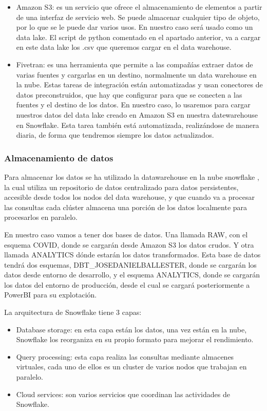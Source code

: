 \begin{itemize}
\begin{itemize}
    \end{itemize}
	\item Amazon S3: \cite{Amazon} es un servicio que ofrece el almacenamiento de elementos a partir de una interfaz de servicio web. Se puede almacenar cualquier tipo de objeto, por lo que se le puede dar varios usos. En nuestro caso será usado como un data lake. El script de python comentado en el apartado anterior, va a cargar en este data lake los .csv que queremos cargar en el data warehouse. 
	\item Fivetran: \cite{Fivetran} es una herramienta que permite a las compañías extraer datos de varias fuentes y cargarlas en un destino, normalmente un data warehouse en la nube. Estas tareas de integración están automatizadas y usan conectores de datos preconstruidos, que hay que configurar para que se conecten a las fuentes y el destino de los datos. En nuestro caso, lo usaremos para cargar nuestros datos del data lake creado en Amazon S3 en nuestra datewarehouse en Snowflake. Esta tarea también está automatizada, realizándose de manera diaria, de forma que tendremos siempre los datos actualizados. 

\end{itemize}

\subsubsection{Almacenamiento de datos}

Para almacenar los datos se ha utilizado la datawarehouse en la nube snowflake \cite{Snowflake}, la cual utiliza un repositorio de datos centralizado para datos persistentes, accesible desde todos los nodos del data warehouse, y que cuando va a procesar las consultas cada clúster almacena una porción de los datos localmente para procesarlos en paralelo.

En nuestro caso vamos a tener dos bases de datos. Una llamada RAW, con el esquema COVID, donde se cargarán desde Amazon S3 los datos crudos. Y otra llamada ANALYTICS dónde estarán los datos transformados. Esta base de datos tendrá dos esquemas, DBT\_JOSEDANIELBALLESTER, donde se cargarán los datos desde entorno de desarrollo, y el esquema ANALYTICS, donde se cargarán los datos del entorno de producción, desde el cual se cargará posteriormente a PowerBI para su explotación.

La arquitectura de Snowflake tiene 3 capas:

\begin{itemize}
	\item Database storage: en esta capa están los datos, una vez están en la nube, Snowflake los reorganiza en su propio formato para mejorar el rendimiento.
	\item Query processing: esta capa realiza las consultas mediante almacenes virtuales, cada uno de ellos es un cluster de varios nodos que trabajan en paralelo.
	\item Cloud services: son varios servicios que coordinan las actividades de Snowflake.
\end{itemize}

